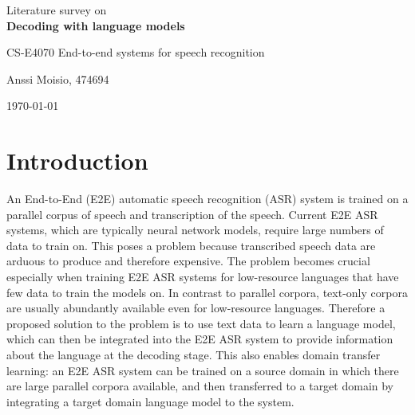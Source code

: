 \documentclass[11pt]{article}
\begin{document}
\begin{titlepage}
    \begin{center}
        \vspace*{1cm}
        \begin{huge}
            Literature survey on \\ \textbf{Decoding with language models}
        \end{huge}
        
        \begin{large}
            \vspace{0.5cm}
            CS-E4070 End-to-end systems for speech recognition

            \vspace{1.5cm}
            Anssi Moisio, 474694
            
            \vspace{0.5cm}
            \today
        \end{large}
    \end{center}
    
\end{titlepage}


\section{Introduction}

An End-to-End (E2E) automatic speech recognition (ASR) system is trained on a parallel corpus of speech and transcription of the speech. Current E2E ASR systems, which are typically neural network models, require large numbers of data to train on. This poses a problem because transcribed speech data are arduous to produce and therefore expensive. The problem becomes crucial especially when training E2E ASR systems for low-resource languages that have few data to train the models on. In contrast to parallel corpora, text-only corpora are usually abundantly available even for low-resource languages. Therefore a proposed solution to the problem is to use text data to learn a language model, which can then be integrated into the E2E ASR system to provide information about the language at the decoding stage. This also enables domain transfer learning: an E2E ASR system can be trained on a source domain in which there are large parallel corpora available, and then transferred to a target domain by integrating a target domain language model to the system.
\end{document}
